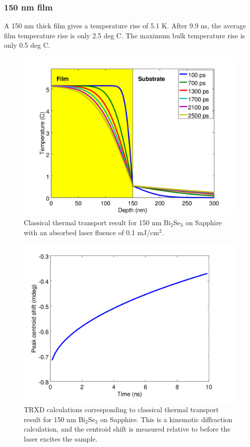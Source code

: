 \documentclass[letterpaper,11pt]{article}
\begin{document}
\subsubsection{150 nm film}
A 150 nm thick film gives a temperature rise of 5.1 K.  After 9.9 ns, the average film temperature rise is only 2.5 deg C. The maximum bulk temperature rise is only 0.5 deg C.
\begin{figure}[h]
\includegraphics[scale = 0.55]{TempProfile150.png}
\caption{Classical thermal transport result for 150 nm Bi$_2$Se$_3$ on Sapphire with an absorbed laser fluence of 0.1 mJ/cm$^2$.}
\end{figure}
\begin{figure}[h]
\includegraphics[scale = 0.55]{CentroidShift150.png}
\caption{TRXD calculations corresponding to classical thermal transport result for 150 nm Bi$_2$Se$_3$ on Sapphire.  This is a kinematic diffraction calculation, and the centroid shift is measured relative to before the laser excites the sample.}
\end{figure}
\end{document}
